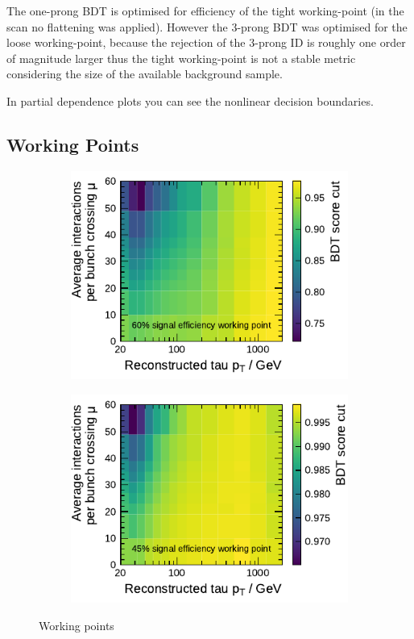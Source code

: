 The one-prong BDT is optimised for efficiency of the tight working-point (in the
scan no flattening was applied). However the 3-prong BDT was optimised for the
loose working-point, because the rejection of the 3-prong ID is roughly one
order of magnitude larger thus the tight working-point is not a stable metric
considering the size of the available background sample.

In partial dependence plots you can see the nonlinear decision boundaries.

\subsection{Working Points}
\label{sec:bdt_working_points}

\begin{figure}[ht]
  \begin{subfigure}[t]{0.48\textwidth}
    \centering
    \includegraphics{./figures/bdt_perf/working_points/grid_1p_subsampling0269_wp.pdf}
  \end{subfigure}\hfill
  \begin{subfigure}[t]{0.48\textwidth}
    \centering
    \includegraphics{./figures/bdt_perf/working_points/grid_3p0327_wp.pdf}
  \end{subfigure}
  \caption{Working points}
\end{figure}


